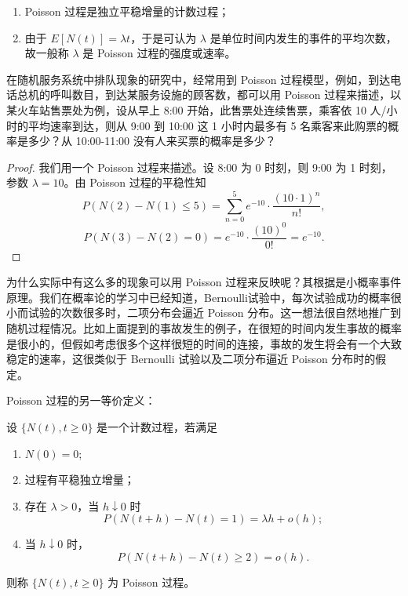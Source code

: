 \documentclass[lang=cn,10pt,thmcnt=section]{elegantbook}
\begin{document}
\begin{remark}
	\begin{enumerate}
		\item Poisson 过程是独立平稳增量的计数过程；
		\item 由于 $E[N(t)] = \lambda t$，于是可认为 $\lambda$ 是单位时间内发生的事件的平均次数，故一般称 $\lambda$ 是 Poisson 过程的强度或速率。
	\end{enumerate}
\end{remark}

\begin{example}
	在随机服务系统中排队现象的研究中，经常用到 Poisson 过程模型，例如，到达电话总机的呼叫数目，到达某服务设施的顾客数，都可以用 Poisson 过程来描述，以某火车站售票处为例，设从早上 8:00 开始，此售票处连续售票，乘客依 10 人/小时的平均速率到达，则从 9:00 到 10:00 这 1 小时内最多有 5 名乘客来此购票的概率是多少？从 10:00-11:00 没有人来买票的概率是多少？
\end{example}
\begin{proof}
	我们用一个 Poisson 过程来描述。设 8:00 为 0 时刻，则 9:00 为 1 时刻，参数 $\lambda = 10$。由 Poisson 过程的平稳性知
\[
P(N(2) - N(1) \leq 5) = \sum_{n=0}^{5} e^{-10} \cdot \frac{(10 \cdot 1)^n}{n!},
\]
\[
P(N(3) - N(2) = 0) = e^{-10} \cdot \frac{(10)^0}{0!} = e^{-10}.
\]

\end{proof}
为什么实际中有这么多的现象可以用 Poisson 过程来反映呢？其根据是小概率事件原理。我们在概率论的学习中已经知道，Bernoulli试验中，每次试验成功的概率很小而试验的次数很多时，二项分布会逼近 Poisson 分布。这一想法很自然地推广到随机过程情况。比如上面提到的事故发生的例子，在很短的时间内发生事故的概率是很小的，但假如考虑很多个这样很短的时间的连接，事故的发生将会有一个大致稳定的速率，这很类似于 Bernoulli 试验以及二项分布逼近 Poisson 分布时的假定。

Poisson 过程的另一等价定义：

\begin{definition}
	设 $\{N(t), t \geq 0\}$ 是一个计数过程，若满足
\begin{enumerate}
    \item $N(0) = 0$;
    \item 过程有平稳独立增量；
    \item 存在 $\lambda > 0$，当 $h \downarrow 0$ 时
    \[
    P(N(t + h) - N(t) = 1) = \lambda h + o(h);
    \]
    \item 当 $h \downarrow 0$ 时，
    \[
    P(N(t + h) - N(t) \geq 2) = o(h).
    \]
\end{enumerate}
则称 $\{N(t), t \geq 0\}$ 为 Poisson 过程。

\end{definition}
\end{document}
